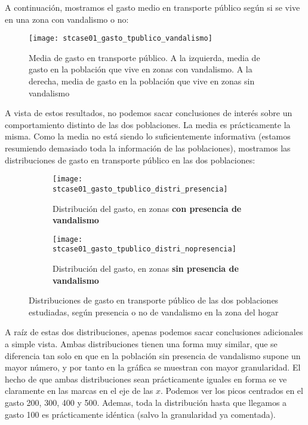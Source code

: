 \documentclass[11pt]{article}
\begin{document}
A continuación, mostramos el gasto medio en transporte público según si se vive en una zona con vandalismo o no:

\begin{figure}[H]
    \centering

    \texttt{[image: stcase01\_gasto\_tpublico\_vandalismo]}
    \caption{Media de gasto en transporte público. A la izquierda, media de gasto en la población que vive en zonas con vandalismo. A la derecha, media de gasto en la población que vive en zonas sin vandalismo}
    \label{gasto_tpublico_medio:figure}
\end{figure}

A vista de estos resultados, no podemos sacar conclusiones de interés sobre un comportamiento distinto de las dos poblaciones. La media es prácticamente la misma. Como la media no está siendo lo suficientemente informativa (estamos resumiendo demasiado toda la información de las poblaciones), mostramos las distribuciones de gasto en transporte público en las dos poblaciones:


\begin{figure}[H]
    \centering

    \begin{subfigure}[b]{0.45 \textwidth}
        \texttt{[image: stcase01\_gasto\_tpublico\_distri\_presencia]}
        \caption{Distribución del gasto, en zonas \textbf{con presencia de vandalismo}}
    \end{subfigure}
    \begin{subfigure}[b]{0.45 \textwidth}
        \texttt{[image: stcase01\_gasto\_tpublico\_distri\_nopresencia]}
        \caption{Distribución del gasto, en zonas \textbf{sin presencia de vandalismo}}
    \end{subfigure}


    \caption{Distribuciones de gasto en transporte público de las dos poblaciones estudiadas, según presencia o no de vandalismo en la zona del hogar}
    \label{gasto_tpublico_completo:figure}
\end{figure}


A raíz de estas dos distribuciones, apenas podemos sacar conclusiones adicionales a simple vista. Ambas distribuciones tienen una forma muy similar, que se diferencia tan solo en que en la población sin presencia de vandalismo supone un mayor número, y por tanto en la gráfica se muestran con mayor granularidad. El hecho de que ambas distribuciones sean prácticamente iguales en forma se ve claramente en las marcas en el eje de las $x$. Podemos ver los picos centrados en el gasto 200, 300, 400 y 500. Ademas, toda la distribución hasta que llegamos a gasto 100 es prácticamente idéntica (salvo la granularidad ya comentada).
\end{document}
